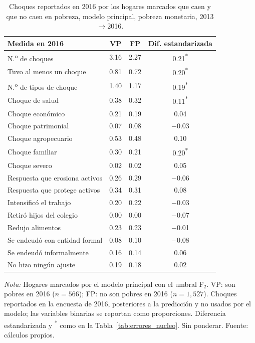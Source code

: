 \begin{table}[H]
  \centering
  \caption{Choques reportados en 2016 por los hogares marcados que caen y que no caen
  en pobreza, modelo principal, pobreza monetaria, 2013$\to$2016.}
  \label{tab:errores_choques}
  \footnotesize
  \begin{tabular}{l cc c}
    \toprule
    \textbf{Medida en 2016} & \textbf{VP} & \textbf{FP} & \textbf{Dif. estandarizada} \\
    \midrule
    N.\textsuperscript{o} de choques & 3.16 & 2.27 & 0.21\textsuperscript{*} \\
    Tuvo al menos un choque & 0.81 & 0.72 & 0.20\textsuperscript{*} \\
    N.\textsuperscript{o} de tipos de choque & 1.40 & 1.17 & 0.19\textsuperscript{*} \\
    Choque de salud & 0.38 & 0.32 & 0.11\textsuperscript{*} \\
    Choque económico & 0.21 & 0.19 & 0.04 \\
    Choque patrimonial & 0.07 & 0.08 & $-$0.03 \\
    Choque agropecuario & 0.53 & 0.48 & 0.10 \\
    Choque familiar & 0.30 & 0.21 & 0.20\textsuperscript{*} \\
    Choque severo & 0.02 & 0.02 & 0.05 \\
    Respuesta que erosiona activos & 0.26 & 0.29 & $-$0.06 \\
    Respuesta que protege activos & 0.34 & 0.31 & 0.08 \\
    Intensificó el trabajo & 0.20 & 0.22 & $-$0.03 \\
    Retiró hijos del colegio & 0.00 & 0.00 & $-$0.07 \\
    Redujo alimentos & 0.23 & 0.23 & $-$0.01 \\
    Se endeudó con entidad formal & 0.08 & 0.10 & $-$0.08 \\
    Se endeudó informalmente & 0.16 & 0.14 & 0.06 \\
    No hizo ningún ajuste & 0.19 & 0.18 & 0.02 \\
    \bottomrule
  \end{tabular}
  \begin{minipage}{0.95\textwidth}
    \vspace{4pt}
    \footnotesize \textit{Nota:} Hogares marcados por el modelo principal con el umbral F$_2$. VP: son pobres en 2016 ($n=566$); FP: no son pobres en 2016 ($n=1{,}527$). Choques reportados en la encuesta de 2016, posteriores a la predicción y no usados por el modelo; las variables binarias se reportan como proporciones. Diferencia estandarizada y \textsuperscript{*} como en la Tabla~\ref{tab:errores_nucleo}. Sin ponderar.
    Fuente: cálculos propios.
  \end{minipage}
\end{table}
